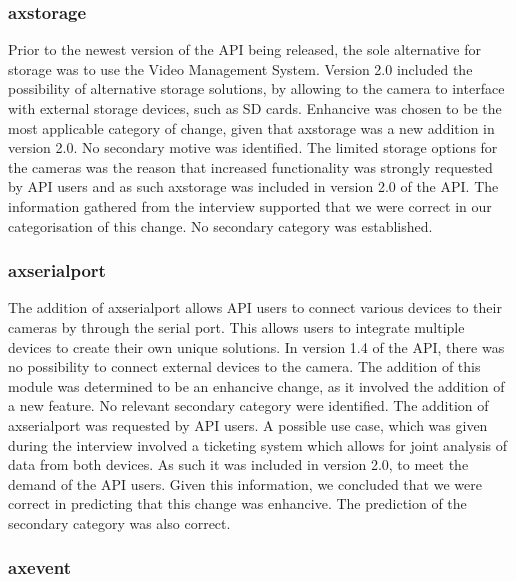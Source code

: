\documentclass{sig-alternate}
\begin{document}
\subsubsection{axstorage}

Prior to the newest version of the API being released, the sole alternative for storage was to use the Video Management System. Version 2.0 included the possibility of alternative storage solutions, by allowing to the camera to interface with external storage devices, such as SD cards. 
Enhancive was chosen to be the most applicable category of change, given that axstorage was a new addition in version 2.0. No secondary motive was identified. 
The limited storage options for the cameras was the reason that increased functionality was strongly requested by API users and as such axstorage was included in version 2.0 of the API.
The information gathered from the interview supported that we were correct in our categorisation of this change. No secondary category was established. 

\subsubsection{axserialport}

The addition of axserialport allows API users to connect various devices to their cameras by through the serial port. This allows users to integrate multiple devices to create their own unique solutions. In version 1.4 of the API, there was no possibility to connect external devices to the camera.
The addition of this module was determined to be an enhancive change, as it involved the addition of a new feature. No relevant secondary category were identified.
The addition of axserialport was requested by API users. A possible use case, which was given during the interview involved a ticketing system which allows for joint analysis of data from both devices. As such it was included in version 2.0, to meet the demand of the API users.
Given this information, we concluded that we were correct in predicting that this change was enhancive. The prediction of the secondary category was also correct. 

\subsubsection{axevent}
\end{document}
